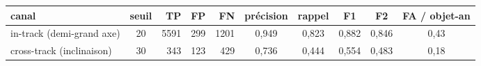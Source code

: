 \begin{tabular}{lcrrrccccc}
\toprule
canal & seuil & TP & FP & FN & précision & rappel & F1 & F2 & FA / objet-an \\
\midrule
in-track (demi-grand axe) & 20 & 5591 & 299 & 1201 & 0,949 & 0,823 & 0,882 & 0,846 & 0,43 \\
cross-track (inclinaison) & 30 & 343 & 123 & 429 & 0,736 & 0,444 & 0,554 & 0,483 & 0,18 \\
\bottomrule
\end{tabular}

